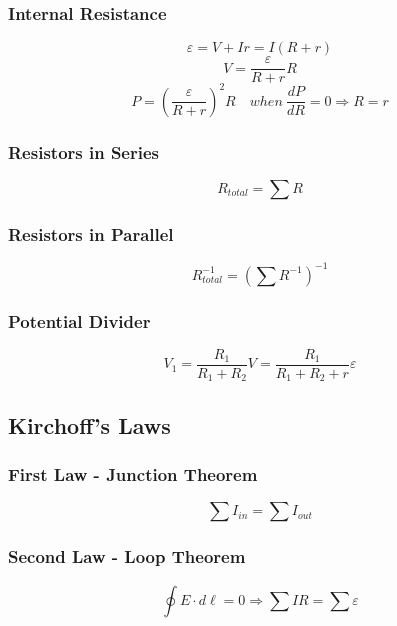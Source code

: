 \documentclass{article}
\begin{document}
\subsubsection*{Internal Resistance}
\[\varepsilon=V+Ir=I(R+r)\]
\[V=\frac{\varepsilon}{R+r}R\]
\[P=\left(\frac{\varepsilon}{R+r}\right)^2R\quad when\ \frac{dP}{dR}=0\Rightarrow R=r\]

\subsubsection*{Resistors in Series}
\[R_{total}=\sum R\]

\subsubsection*{Resistors in Parallel}
\[R_{total}^{-1}=(\sum R^{-1})^{-1}\]

\subsubsection*{Potential Divider}
\[V_1=\frac{R_1}{R_1+R_2}V=\frac{R_1}{R_1+R_2+r}\varepsilon\]

\subsection*{Kirchoff's Laws}
\subsubsection*{First Law - Junction Theorem}
\[\sum I_{in}=\sum I_{out}\]

\subsubsection*{Second Law - Loop Theorem}
\[\oint E\cdot d\ell=0\Rightarrow \sum IR = \sum \varepsilon\]
\end{document}
